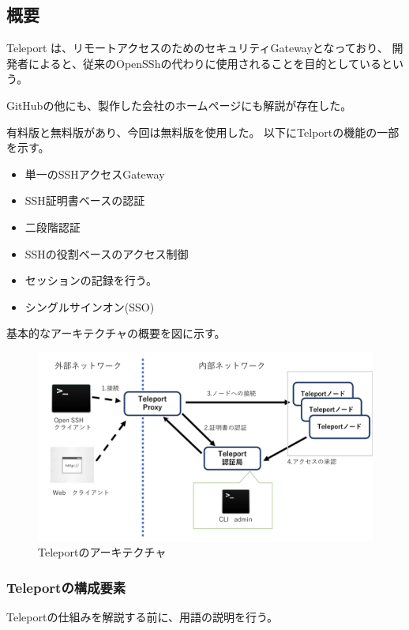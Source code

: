 \documentclass[11pt,a4j,titlepage]{jreport}
\begin{document}
\subsection*{概要}
Teleport \cite{teleport}は、リモートアクセスのためのセキュリティGatewayとなっており、
開発者によると、従来のOpenSShの代わりに使用されることを目的としているという。 

GitHubの他にも、製作した会社のホームページにも解説が存在した\cite{teleportpage}。

有料版と無料版があり、今回は無料版を使用した。
以下にTelportの機能の一部を示す。

\begin{itemize}
    \setlength{\parskip}{0.1cm} %
    \setlength{\itemsep}{0.1cm}
    \item 単一のSSHアクセスGateway
    \item SSH証明書ベースの認証
    \item 二段階認証
    \item SSHの役割ベースのアクセス制御
    \item セッションの記録を行う。
    \item シングルサインオン(SSO)
\end{itemize}

基本的なアーキテクチャの概要を図に示す。
\begin{figure}[tbp]
    \centering
    \includegraphics*[width=1.0\textwidth,page=1]{graphs/teleport_archtecture.pdf}
    \caption{Teleportのアーキテクチャ}
    \label{teleport_archtecture}
\end{figure}


\subsubsection*{Teleportの構成要素}
Teleportの仕組みを解説する前に、用語の説明を行う。
\end{document}

